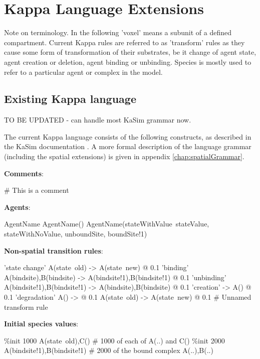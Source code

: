 \chapter{Kappa Language Extensions}

Note on terminology. In the following 'voxel' means a subunit of a defined compartment. Current Kappa rules are referred to as 'transform' rules as they cause some form of transformation of their substrates, be it change of agent state, agent creation or deletion, agent binding or unbinding. Species is mostly used to refer to a particular agent or complex in the model.

\section{Existing Kappa language}

TO BE UPDATED - can handle most KaSim grammar now.

The current Kappa language consists of the following constructs, as described in the KaSim documentation \citep{XXXXXX}. A more formal description of the language grammar (including the spatial extensions) is given in appendix \ref{chap:spatialGrammar}.

\textbf{Comments}:

\begin{kappasource}
# This is a comment
\end{kappasource} 

\textbf{Agents}:

\begin{kappasource}
AgentName
AgentName()
AgentName(stateWithValue~stateValue, stateWithNoValue, unboundSite, boundSite!1)
\end{kappasource} 


\textbf{Non-spatial transition rules}:

\begin{kappasource}
'state change' A(state~old) -> A(state~new) @ 0.1
'binding'      A(bindsite),B(bindsite) -> A(bindsite!1),B(bindsite!1) @ 0.1
'unbinding'    A(bindsite!1),B(bindsite!1) -> A(bindsite),B(bindsite) @ 0.1
'creation'     -> A() @ 0.1
'degradation'  A() -> @ 0.1
A(state~old) -> A(state~new) @ 0.1 # Unnamed transform rule
\end{kappasource} 

\textbf{Initial species values}:

\begin{kappasource}
\%init 1000 A(state~old),C()            # 1000 of each of A(..) and C()
\%init 2000 A(bindsite!1),B(bindsite!1) # 2000 of the bound complex A(..),B(..)
\end{kappasource} 

